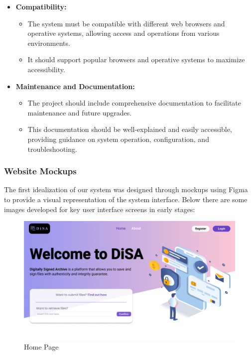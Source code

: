 \documentclass[a4paper,11pt]{article}
\begin{document}
\begin{itemize}
                    \item \textbf{Compatibility:} 
                    \begin{itemize}
                        \item The system must be compatible with different web browsers and operative systems, allowing access and operations from various environments.
                        \item It should support popular browsers and operative systems to maximize accessibility.
                    \end{itemize}
                    
                    \item \textbf{Maintenance and Documentation:} 
                    \begin{itemize}
                        \item The project should include comprehensive documentation to facilitate maintenance and future upgrades. 
                        \item This documentation should be well-explained and easily accessible, providing guidance on system operation, configuration, and troubleshooting.
                    \end{itemize}
                \end{itemize}
                
            \pagebreak        
            \subsubsection{Website Mockups} \label{sec:mockups}
                \quad The first idealization of our system was designed through mockups using Figma \cite{Figma} to provide a visual representation of the system interface. Below there are some images developed for key user interface screens in early stages:
                
                        \begin{figure}[htbp]
                        \centering
                        \includegraphics[width=0.8\linewidth]{images/Landing Page.png}
                        \caption{Home Page}
                        \end{figure}
\end{document}
